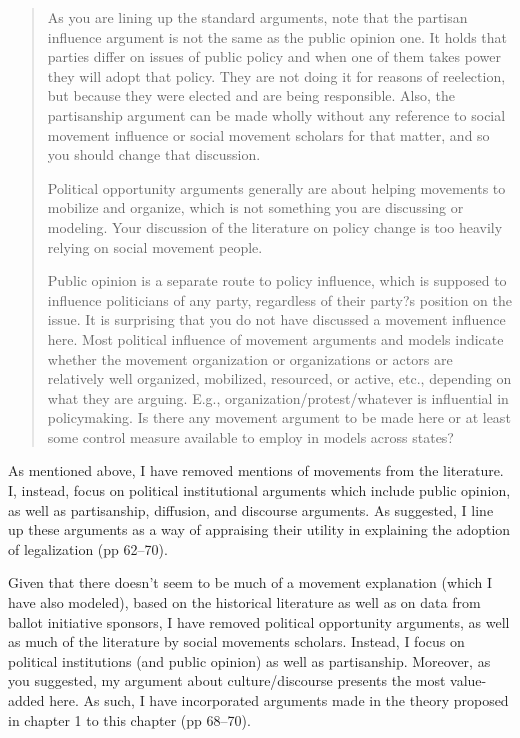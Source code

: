 \documentclass[12pt,stdletter,dateno,sigleft]{newlfm} %
\begin{document}
\begin{newlfm}
\begin{quotation}{\color{red}\noindent \footnotesize
As you are lining up the standard arguments, note that the partisan influence argument is not the same as the public opinion one. It holds that parties differ on issues of public policy and when one of them takes power they will adopt that policy.  They are not doing it for reasons of reelection, but because they were elected and are being responsible.  Also, the partisanship argument can be made wholly without any reference to social movement influence or social movement scholars for that matter, and so you should change that discussion.  

Political opportunity arguments generally are about helping movements to mobilize and organize, which is not something you are discussing or modeling.  Your discussion of the literature on policy change is too heavily relying on social movement people. 

Public opinion is a separate route to policy influence, which is supposed to influence politicians of any party, regardless of their party?s position on the issue.  It is surprising that you do not have discussed a movement influence here.  Most political influence of movement arguments and models indicate whether the movement organization or organizations or actors are relatively well organized, mobilized, resourced, or active, etc., depending on what they are arguing. E.g., organization/protest/whatever is influential in policymaking. Is there any movement argument to be made here or at least some control measure available to employ in models across states?  
}
\end{quotation}

As mentioned above, I have removed mentions of movements from the literature. I, instead, focus on political institutional arguments which include public opinion, as well as partisanship, diffusion, and discourse arguments. As suggested, I line up these arguments as a way of appraising their utility in explaining the adoption of legalization (pp 62--70). 


Given that there doesn't seem to be much of a movement explanation (which I have also modeled), based on the historical literature as well as on data from ballot initiative sponsors, I have removed political opportunity arguments, as well as much of the literature by social movements scholars. Instead, I focus on political institutions (and public opinion) as well as partisanship. Moreover, as you suggested, my argument about culture/discourse presents the most value-added here. As such, I have incorporated arguments made in the theory proposed in chapter 1 to this chapter (pp 68--70). 



\end{newlfm}
\end{document}
